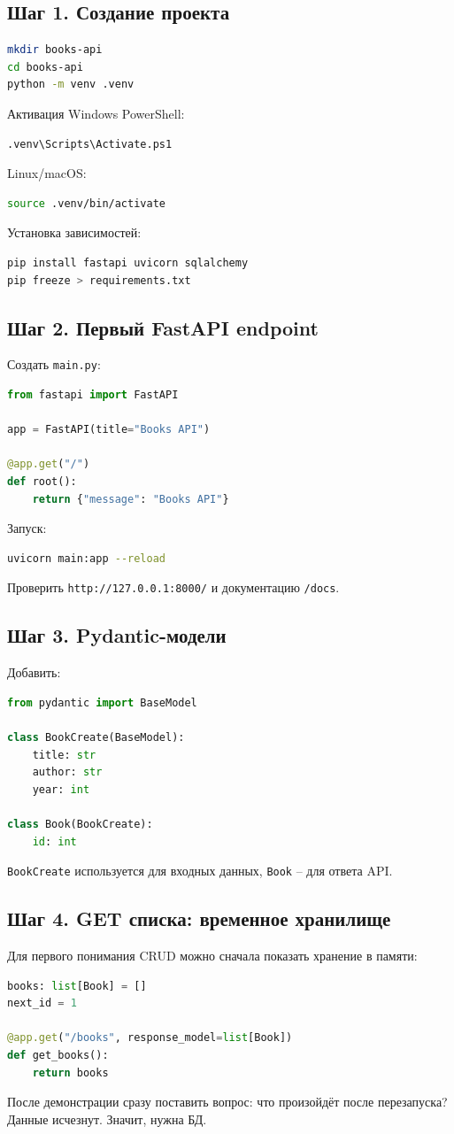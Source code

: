 \documentclass[12pt,a4paper]{article}
\begin{document}
\subsection{Шаг 1. Создание проекта}
\begin{lstlisting}[language=bash]
mkdir books-api
cd books-api
python -m venv .venv
\end{lstlisting}
Активация Windows PowerShell:
\begin{lstlisting}[language=bash]
.venv\Scripts\Activate.ps1
\end{lstlisting}
Linux/macOS:
\begin{lstlisting}[language=bash]
source .venv/bin/activate
\end{lstlisting}
Установка зависимостей:
\begin{lstlisting}[language=bash]
pip install fastapi uvicorn sqlalchemy
pip freeze > requirements.txt
\end{lstlisting}

\subsection{Шаг 2. Первый FastAPI endpoint}
Создать \texttt{main.py}:
\begin{lstlisting}[language=Python]
from fastapi import FastAPI

app = FastAPI(title="Books API")

@app.get("/")
def root():
    return {"message": "Books API"}
\end{lstlisting}
Запуск:
\begin{lstlisting}[language=bash]
uvicorn main:app --reload
\end{lstlisting}
Проверить \texttt{http://127.0.0.1:8000/} и документацию \texttt{/docs}.

\subsection{Шаг 3. Pydantic-модели}
Добавить:
\begin{lstlisting}[language=Python]
from pydantic import BaseModel

class BookCreate(BaseModel):
    title: str
    author: str
    year: int

class Book(BookCreate):
    id: int
\end{lstlisting}
\texttt{BookCreate} используется для входных данных, \texttt{Book} -- для ответа API.

\subsection{Шаг 4. GET списка: временное хранилище}
Для первого понимания CRUD можно сначала показать хранение в памяти:
\begin{lstlisting}[language=Python]
books: list[Book] = []
next_id = 1

@app.get("/books", response_model=list[Book])
def get_books():
    return books
\end{lstlisting}
После демонстрации сразу поставить вопрос: что произойдёт после перезапуска? Данные исчезнут. Значит, нужна БД.
\end{document}
